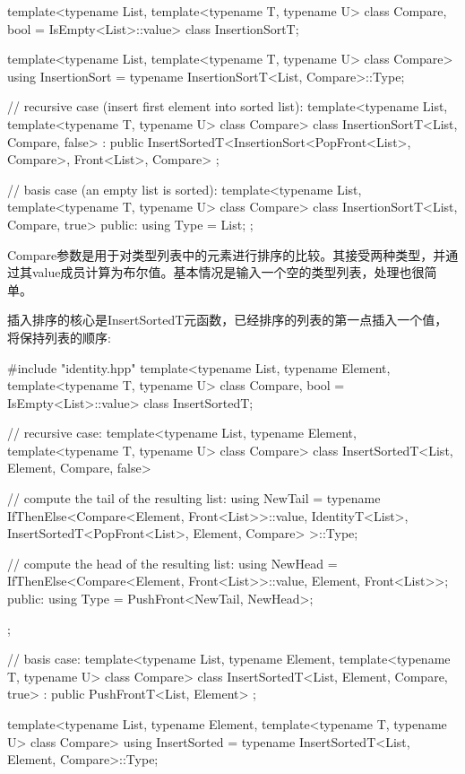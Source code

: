 \begin{cpp}
template<typename List,
		template<typename T, typename U> class Compare,
		bool = IsEmpty<List>::value>
class InsertionSortT;

template<typename List,
		template<typename T, typename U> class Compare>
using InsertionSort = typename InsertionSortT<List, Compare>::Type;

// recursive case (insert first element into sorted list):
template<typename List,
		template<typename T, typename U> class Compare>
class InsertionSortT<List, Compare, false>
: public InsertSortedT<InsertionSort<PopFront<List>, Compare>,
						Front<List>, Compare>
{
};

// basis case (an empty list is sorted):
template<typename List,
		template<typename T, typename U> class Compare>
class InsertionSortT<List, Compare, true>
{
	public:
	using Type = List;
};
\end{cpp}

Compare参数是用于对类型列表中的元素进行排序的比较。其接受两种类型，并通过其value成员计算为布尔值。基本情况是输入一个空的类型列表，处理也很简单。

插入排序的核心是InsertSortedT元函数，已经排序的列表的第一点插入一个值，将保持列表的顺序:

\begin{cpp}
#include "identity.hpp"
template<typename List, typename Element,
		template<typename T, typename U> class Compare,
		bool = IsEmpty<List>::value>
class InsertSortedT;

// recursive case:
template<typename List, typename Element,
		template<typename T, typename U> class Compare>
class InsertSortedT<List, Element, Compare, false>
{
	// compute the tail of the resulting list:
	using NewTail =
		typename IfThenElse<Compare<Element, Front<List>>::value,
							IdentityT<List>,
							InsertSortedT<PopFront<List>, Element, Compare>
				>::Type;
				
	// compute the head of the resulting list:
	using NewHead = IfThenElse<Compare<Element, Front<List>>::value,
								Element,
								Front<List>>;
	public:
	using Type = PushFront<NewTail, NewHead>;
};

// basis case:
template<typename List, typename Element,
		template<typename T, typename U> class Compare>
class InsertSortedT<List, Element, Compare, true>
: public PushFrontT<List, Element>
{
};

template<typename List, typename Element,
		template<typename T, typename U> class Compare>
using InsertSorted = typename InsertSortedT<List, Element, Compare>::Type;
\end{cpp}

